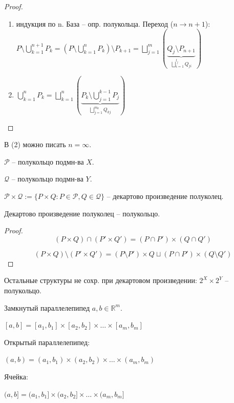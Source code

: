 \begin{proof}
    \begin{enumerate}
        \item индукция по n. База -- опр. полукольца. Переход ($n \rightarrow n+1$): \\ $P \setminus \bigcup_{k=1}^{n+1}P_k = \left(P \setminus \bigcup_{k=1}^nP_k\right) \setminus P_{k+1} = \bigsqcup_{j=1}^{m} \left(\underbrace{Q_j \setminus P_{n+1}}_{\bigsqcup_{i=1}^{l_j}Q_{ji}}\right)$
        \item $\bigcup_{k=1}^{n} P_k = \bigsqcup_{k=1}^{n} \left(\underbrace{P_k \setminus \bigcup_{j=1}^{k-1} P_j}_{\bigsqcup_{j=1}^{m_k} Q_{kj}}\right)$
    \end{enumerate}
\end{proof}

\begin{remark}
    В (2) можно писать $n = \infty$.
\end{remark}

\begin{definition}
    $\mathcal{P}$ -- полукольцо подмн-ва $X$.

    $\mathcal{Q}$ -- полукольцо подмн-ва $Y$.

    $\mathcal{P} \times \mathcal{Q} := \{P \times Q : P \in \mathcal{P}, Q \in \mathcal{Q}\}$ -- декартово произведение полуколец.
\end{definition}

\begin{theorem}
    Декартово произведение полуколец -- полукольцо.
\end{theorem}
\begin{proof}
    
    $$(P \times Q) \cap (P' \times Q') = (P \cap P') \times (Q \cap Q')$$

    $$(P \times Q) \setminus (P' \times Q') = (P \setminus P') \times Q \sqcup (P \cap P') \times (Q \setminus Q')$$
\end{proof}

\begin{remark}
    Остальные структуры не сохр. при декартовом произведении: $2^X \times 2^Y$ -- полукольцо.
\end{remark}

\begin{definition}
    Замкнутый параллелепипед $a, b \in \mathbb{R}^m$.

    $[a, b] = [a_1, b_1] \times [a_2, b_2] \times \dots \times [a_m, b_m]$

    Открытый параллелепипед:

    $(a, b) = (a_1, b_1) \times (a_2, b_2) \times \dots \times (a_m, b_m)$

    Ячейка:
    
    $(a, b] = (a_1, b_1] \times (a_2, b_2] \times \dots \times (a_m, b_m]$
\end{definition}

